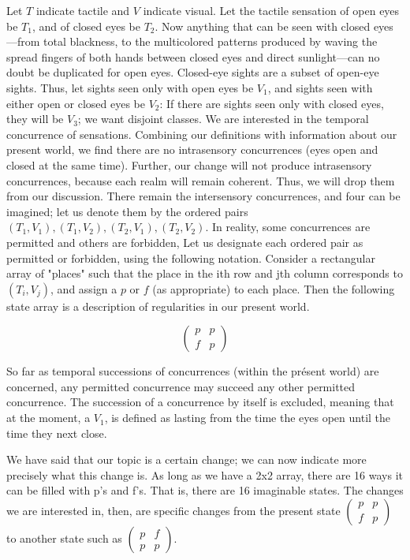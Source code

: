 \documentclass[10pt,twoside,draft]{memoir}
\begin{document}
{Let $T$ indicate tactile and $V$ indicate visual. Let the tactile sensation of 
open eyes be $T_1$, and of closed eyes be $T_2$. Now anything that can be seen 
with closed eyes---from total blackness, to the multicolored patterns produced 
by waving the spread fingers of both hands between closed eyes and direct 
sunlight---can no doubt be duplicated for open eyes. Closed-eye sights are a 
subset of open-eye sights. Thus, let sights seen only with open eyes be $V_1$, 
and sights seen with either open or closed eyes be $V_2$: If there are sights seen 
only with closed eyes, they will be $V_3$; we want disjoint classes. We are 
interested in the temporal concurrence of sensations. Combining our 
definitions with information about our present world, we find there are no 
intrasensory concurrences (eyes open and closed at the same time). Further, 
our change will not produce intrasensory concurrences, because each realm 
will remain coherent. Thus, we will drop them from our discussion. There 
remain the intersensory concurrences, and four can be imagined; let us 
denote them by the ordered pairs $(T_1, V_1), (T_1, V_2), (T_2, V_1), (T_2, V_2)$. In 
reality, some concurrences are permitted and others are forbidden, Let us 
designate each ordered pair as permitted or forbidden, using the following 
notation. Consider a rectangular array of "places" such that the place in the 
ith row and jth column corresponds to $(T_i, V_j)$, and assign a $p$ or $f$ (as 
appropriate) to each place. Then the following state array is a description of 
regularities in our present world. 

$$\begin{pmatrix}
	p & p\\
	f & p 
\end{pmatrix}$$


So far as temporal successions of concurrences (within the présent 
world) are concerned, any permitted concurrence may succeed any other 
permitted concurrence. The succession of a concurrence by itself is 
excluded, meaning that at the moment, a $V_1$, is defined as lasting from the 
time the eyes open until the time they next close. 

We have said that our topic is a certain change; we can now indicate 
more precisely what this change is. As long as we have a 2x2 array, there are 
16 ways it can be filled with p's and f's. That is, there are 16 imaginable 
states. The changes we are interested in, then, are specific changes from the 
present state
$\begin{pmatrix}
	p & p \\
	f & p
\end{pmatrix}$ to another state such as
$\begin{pmatrix}
	p & f \\
	p & p
\end{pmatrix}$.

}
\end{document}
